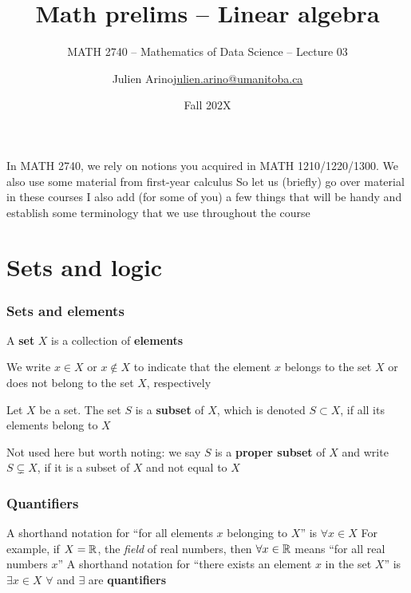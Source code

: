 \documentclass[aspectratio=169]{beamer}\usepackage[]{graphicx}\usepackage[]{xcolor}
\subtitle{MATH 2740 -- Mathematics of Data Science -- Lecture 03}
\author{\texorpdfstring{Julien Arino\newline\url{julien.arino@umanitoba.ca}}{Julien Arino}}
\institute{Department of Mathematics @ University of Manitoba}
\date{Fall 202X}
\title{Math prelims -- Linear algebra}
\begin{document}

\begin{frame}
In MATH 2740, we rely on notions you acquired in MATH 1210/1220/1300. We also use some material from first-year calculus
\vfill
So let us (briefly) go over material in these courses
\vfill
I also add (for some of you) a few things that will be handy and establish some terminology that we use throughout the course
\end{frame}



\section{Sets and logic}

\begin{frame}
\frametitle{Sets and elements}
	\begin{definition}[Set]
		A \textbf{set} $X$ is a collection of \textbf{elements}
	\end{definition}
	We write $x\in X$ or $x\not\in X$ to indicate that the element $x$ belongs to
	the set $X$ or does not belong to the set $X$, respectively
	\vfill
	\begin{definition}[Subset]
		Let $X$ be a set. The set $S$ is a \textbf{subset} of $X$, which is denoted
		$S\subset X$, if all its elements belong to $X$
	\end{definition}
Not used here but worth noting: we say $S$ is a \textbf{proper subset} of $X$ and write $S\subsetneq X$, if it is a subset of $X$ and not equal to $X$
\end{frame}


\begin{frame}
\frametitle{Quantifiers}
	A shorthand notation for ``for all elements $x$ belonging to $X$'' is $\forall x\in X$
	\vfill
	For example, if $X=\mathbb{R}$, the \emph{field} of real numbers, then $\forall x\in\mathbb{R}$ means ``for all real numbers $x$''
	\vfill
	A shorthand notation for ``there exists an element $x$ in the set $X$'' is
	$\exists x\in X$
	\vfill
	$\forall$ and $\exists$ are \textbf{quantifiers}
\end{frame}
\end{document}
